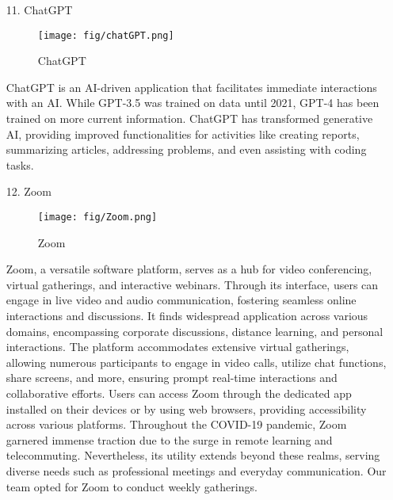 \documentclass[conference]{IEEEtran}
\begin{document}
\begin{enumerate}
    \item[11.]ChatGPT
    \begin{figure}[h]
    \centering
    \texttt{[image: fig/chatGPT.png]}
    \label{fig:ChatGPT}
    \caption{ChatGPT} 
    \end{figure}
    \item[]ChatGPT is an AI-driven application that facilitates immediate interactions with an AI. While GPT-3.5 was trained on data until 2021, GPT-4 has been trained on more current information. ChatGPT has transformed generative AI, providing improved functionalities for activities like creating reports, summarizing articles, addressing problems, and even assisting with coding tasks.\\ 
   
    \item[12.]Zoom \cite{kohnke2022facilitating}
    \begin{figure}[h]
    \centering
    \texttt{[image: fig/Zoom.png]}
    \label{fig:Zoom}
    \caption{Zoom} 
    \end{figure}
    \item[]Zoom, a versatile software platform, serves as a hub for video conferencing, virtual gatherings, and interactive webinars. Through its interface, users can engage in live video and audio communication, fostering seamless online interactions and discussions. It finds widespread application across various domains, encompassing corporate discussions, distance learning, and personal interactions. The platform accommodates extensive virtual gatherings, allowing numerous participants to engage in video calls, utilize chat functions, share screens, and more, ensuring prompt real-time interactions and collaborative efforts. Users can access Zoom through the dedicated app installed on their devices or by using web browsers, providing accessibility across various platforms. Throughout the COVID-19 pandemic, Zoom garnered immense traction due to the surge in remote learning and telecommuting. Nevertheless, its utility extends beyond these realms, serving diverse needs such as professional meetings and everyday communication. Our team opted for Zoom to conduct weekly gatherings.\\ \\ \\ \\ \\ \\


\end{enumerate}
\end{document}
